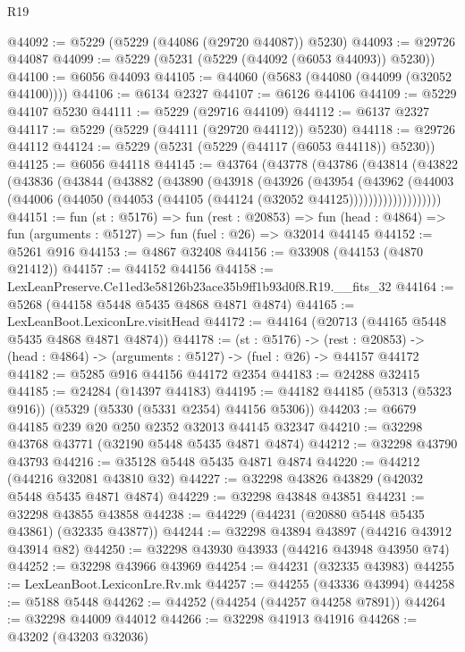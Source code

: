 \begin{lexlean}{R19}
\begin{coremodule}
@44092 := @5229 (@5229 (@44086 (@29720 @44087)) @5230)
@44093 := @29726 @44087
@44099 := @5229 (@5231 (@5229 (@44092 (@6053 @44093)) @5230))
@44100 := @6056 @44093
@44105 := @44060 (@5683 (@44080 (@44099 (@32052 @44100))))
@44106 := @6134 @2327
@44107 := @6126 @44106
@44109 := @5229 @44107 @5230
@44111 := @5229 (@29716 @44109)
@44112 := @6137 @2327
@44117 := @5229 (@5229 (@44111 (@29720 @44112)) @5230)
@44118 := @29726 @44112
@44124 := @5229 (@5231 (@5229 (@44117 (@6053 @44118)) @5230))
@44125 := @6056 @44118
@44145 := @43764
    (@43778
      (@43786
        (@43814
          (@43822
            (@43836
              (@43844
                (@43882
                  (@43890
                    (@43918
                      (@43926
                        (@43954
                          (@43962
                            (@44003
                              (@44006
                                (@44050 (@44053 (@44105 (@44124 (@32052 @44125)))))))))))))))))))
@44151 := fun (st : @5176) =>
  fun (rest : @20853) =>
  fun (head : @4864) => fun (arguments : @5127) => fun (fuel : @26) => @32014 @44145
@44152 := @5261 @916
@44153 := @4867 @32408
@44156 := @33908 (@44153 (@4870 @21412))
@44157 := @44152 @44156
@44158 := LexLeanPreserve.Ce11ed3e58126b23ace35b9ff1b93d0f8.R19.__fits_32
@44164 := @5268 (@44158 @5448 @5435 @4868 @4871 @4874)
@44165 := LexLeanBoot.LexiconLre.visitHead
@44172 := @44164 (@20713 (@44165 @5448 @5435 @4868 @4871 @4874))
@44178 := (st : @5176) ->
  (rest : @20853) -> (head : @4864) -> (arguments : @5127) -> (fuel : @26) -> @44157 @44172
@44182 := @5285 @916 @44156 @44172 @2354
@44183 := @24288 @32415
@44185 := @24284 (@14397 @44183)
@44195 := @44182 @44185 (@5313 (@5323 @916)) (@5329 (@5330 (@5331 @2354) @44156 @5306))
@44203 := @6679 @44185 @239 @20 @250 @2352 @32013 @44145 @32347
@44210 := @32298 @43768 @43771 (@32190 @5448 @5435 @4871 @4874)
@44212 := @32298 @43790 @43793
@44216 := @35128 @5448 @5435 @4871 @4874
@44220 := @44212 (@44216 @32081 @43810 @32)
@44227 := @32298 @43826 @43829 (@42032 @5448 @5435 @4871 @4874)
@44229 := @32298 @43848 @43851
@44231 := @32298 @43855 @43858
@44238 := @44229 (@44231 (@20880 @5448 @5435 @43861) (@32335 @43877))
@44244 := @32298 @43894 @43897 (@44216 @43912 @43914 @82)
@44250 := @32298 @43930 @43933 (@44216 @43948 @43950 @74)
@44252 := @32298 @43966 @43969
@44254 := @44231 (@32335 @43983)
@44255 := LexLeanBoot.LexiconLre.Rv.mk
@44257 := @44255 (@43336 @43994)
@44258 := @5188 @5448
@44262 := @44252 (@44254 (@44257 @44258 @7891))
@44264 := @32298 @44009 @44012
@44266 := @32298 @41913 @41916
@44268 := @43202 (@43203 @32036)

\end{coremodule}
\end{lexlean}
